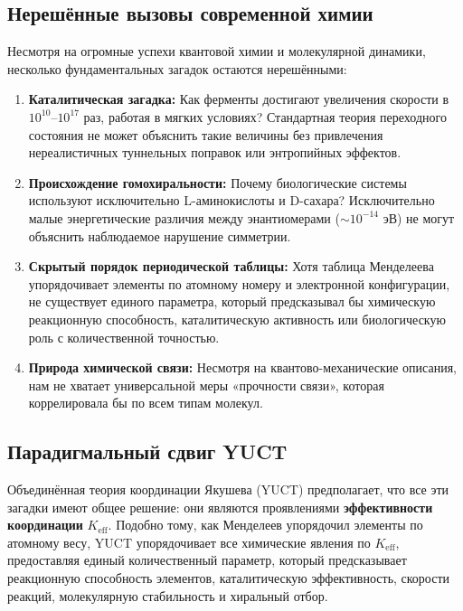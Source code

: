\documentclass[12pt,a4paper]{article}
\theoremstyle{remark}
\newcommand{\Keff}{K_{\mathrm{eff}}}
\begin{document}
	\subsection{Нерешённые вызовы современной химии}
	
	Несмотря на огромные успехи квантовой химии и молекулярной динамики, несколько фундаментальных загадок остаются нерешёнными:
	
	\begin{enumerate}
		\item \textbf{Каталитическая загадка:} Как ферменты достигают увеличения скорости в $10^{10}$--$10^{17}$ раз, работая в мягких условиях? Стандартная теория переходного состояния не может объяснить такие величины без привлечения нереалистичных туннельных поправок или энтропийных эффектов.
		
		\item \textbf{Происхождение гомохиральности:} Почему биологические системы используют исключительно L-аминокислоты и D-сахара? Исключительно малые энергетические различия между энантиомерами ($\sim 10^{-14}$ эВ) не могут объяснить наблюдаемое нарушение симметрии.
		
		\item \textbf{Скрытый порядок периодической таблицы:} Хотя таблица Менделеева упорядочивает элементы по атомному номеру и электронной конфигурации, не существует единого параметра, который предсказывал бы химическую реакционную способность, каталитическую активность или биологическую роль с количественной точностью.
		
		\item \textbf{Природа химической связи:} Несмотря на квантово-механические описания, нам не хватает универсальной меры «прочности связи», которая коррелировала бы по всем типам молекул.
	\end{enumerate}
	
	\subsection{Парадигмальный сдвиг YUCT}
	
	Объединённая теория координации Якушева (YUCT) предполагает, что все эти загадки имеют общее решение: они являются проявлениями \textbf{эффективности координации} $\Keff$. Подобно тому, как Менделеев упорядочил элементы по атомному весу, YUCT упорядочивает все химические явления по $\Keff$, предоставляя единый количественный параметр, который предсказывает реакционную способность элементов, каталитическую эффективность, скорости реакций, молекулярную стабильность и хиральный отбор.
	
\end{document}
